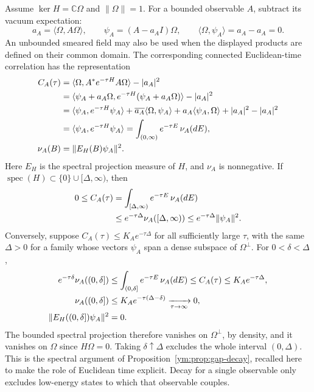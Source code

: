 Assume $\ker H=\mathbb C\Omega$ and $\|\Omega\|=1$. For a bounded
observable $A$, subtract its vacuum expectation:
\begin{equation}\label{qft:vacuum-subtracted-state}
 a_A=\langle\Omega,A\Omega\rangle,\qquad
 \psi_A=(A-a_AI)\Omega,\qquad
 \langle\Omega,\psi_A\rangle=a_A-a_A=0.
\end{equation}
An unbounded smeared field may also be used when the displayed products
are defined on their common domain. The corresponding connected
Euclidean-time correlation has the representation
\begin{align}
 C_A(\tau)
 &=\langle\Omega,A^*e^{-\tau H}A\Omega\rangle-|a_A|^2\notag\\
 &=\langle\psi_A+a_A\Omega,
       e^{-\tau H}(\psi_A+a_A\Omega)\rangle-|a_A|^2\notag\\
 &=\langle\psi_A,e^{-\tau H}\psi_A\rangle
   +\overline{a_A}\langle\Omega,\psi_A\rangle
   +a_A\langle\psi_A,\Omega\rangle
   +|a_A|^2-|a_A|^2\notag\\
 &=\langle\psi_A,e^{-\tau H}\psi_A\rangle
   =\int_{(0,\infty)}e^{-\tau E}\,\nu_A(dE),\notag\\
 \nu_A(B)&=\|E_H(B)\psi_A\|^2.
 \label{qft:connected-spectral-laplace}
\end{align}
Here $E_H$ is the spectral projection measure of $H$, and $\nu_A$ is
nonnegative. If $\operatorname{spec}(H)\subset\{0\}\cup[\Delta,\infty)$,
then
\begin{align}
 0\le C_A(\tau)
 &=\int_{[\Delta,\infty)}e^{-\tau E}\,\nu_A(dE)\notag\\
 &\le e^{-\tau\Delta}\nu_A([\Delta,\infty))
 \le e^{-\tau\Delta}\|\psi_A\|^2.
 \label{qft:gap-implies-euclidean-decay}
\end{align}
Conversely, suppose $C_A(\tau)\le K_Ae^{-\tau\Delta}$ for all sufficiently
large $\tau$, with the same $\Delta>0$ for a family whose vectors
$\psi_A$ span a dense subspace of $\Omega^\perp$. For $0<\delta<\Delta$,
\begin{align}
 e^{-\tau\delta}\nu_A((0,\delta])
 &\le\int_{(0,\delta]}e^{-\tau E}\,\nu_A(dE)
 \le C_A(\tau)\le K_Ae^{-\tau\Delta},\notag\\
 \nu_A((0,\delta])
 &\le K_Ae^{-\tau(\Delta-\delta)}
 \xrightarrow[\tau\to\infty]{}0,\notag\\
 \|E_H((0,\delta])\psi_A\|^2&=0.
 \label{qft:euclidean-decay-implies-gap}
\end{align}
The bounded spectral projection therefore vanishes on
$\Omega^\perp$, by density, and it vanishes on $\Omega$ since
$H\Omega=0$. Taking $\delta\uparrow\Delta$ excludes the whole interval
$(0,\Delta)$. This is the spectral argument of
Proposition~\ref{ym:prop:gap-decay}, recalled here to make the role of
Euclidean time explicit. Decay for a single observable only excludes
low-energy states to which that observable couples.

